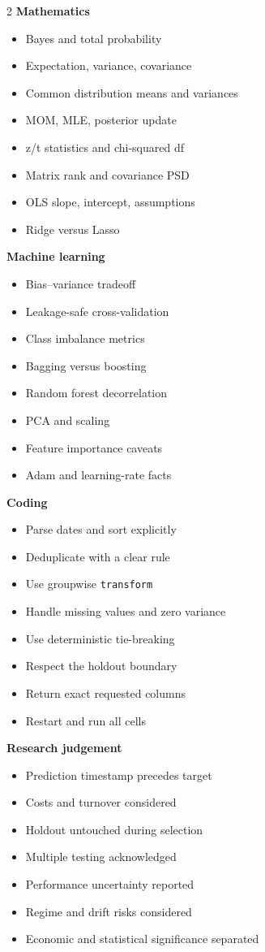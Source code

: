 \documentclass[10pt,a4paper]{article}
\newcommand{\code}[1]{\texttt{#1}}
\begin{document}
\begin{multicols}{2}
\textbf{Mathematics}
\begin{itemize}
  \item Bayes and total probability
  \item Expectation, variance, covariance
  \item Common distribution means and variances
  \item MOM, MLE, posterior update
  \item z/t statistics and chi-squared df
  \item Matrix rank and covariance PSD
  \item OLS slope, intercept, assumptions
  \item Ridge versus Lasso
\end{itemize}

\textbf{Machine learning}
\begin{itemize}
  \item Bias--variance tradeoff
  \item Leakage-safe cross-validation
  \item Class imbalance metrics
  \item Bagging versus boosting
  \item Random forest decorrelation
  \item PCA and scaling
  \item Feature importance caveats
  \item Adam and learning-rate facts
\end{itemize}

\columnbreak
\textbf{Coding}
\begin{itemize}
  \item Parse dates and sort explicitly
  \item Deduplicate with a clear rule
  \item Use groupwise \code{transform}
  \item Handle missing values and zero variance
  \item Use deterministic tie-breaking
  \item Respect the holdout boundary
  \item Return exact requested columns
  \item Restart and run all cells
\end{itemize}

\textbf{Research judgement}
\begin{itemize}
  \item Prediction timestamp precedes target
  \item Costs and turnover considered
  \item Holdout untouched during selection
  \item Multiple testing acknowledged
  \item Performance uncertainty reported
  \item Regime and drift risks considered
  \item Economic and statistical significance separated
\end{itemize}
\end{multicols}
\end{document}

